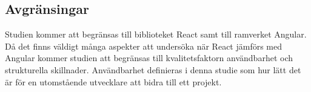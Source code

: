 \subsection{Avgränsingar}
\label{subsec:axel-delimitations}
Studien kommer att begränsas till biblioteket React samt till ramverket Angular. Då det finns väldigt många aspekter att undersöka när React jämförs med Angular kommer studien att begränsas till kvalitetsfaktorn användbarhet och strukturella skillnader. Användbarhet definieras i denna studie som hur lätt det är för en utomstående utvecklare att bidra till ett projekt.

